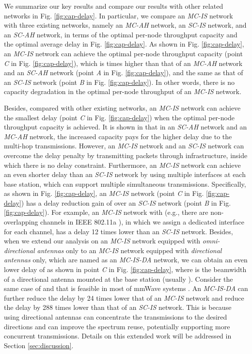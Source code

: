 \documentclass[10pt,journal]{IEEEtran}
\begin{document}
We summarize our key results and compare our results with other related networks in Fig. \ref{fig:cap-delay}. In particular, we compare an \textit{MC-IS} network with three existing networks, namely an \textit{MC-AH} network, an \textit{SC-IS} network, and an \textit{SC-AH} network, in terms of the optimal per-node throughput capacity  and the optimal average delay  in Fig. \ref{fig:cap-delay}. As shown in Fig. \ref{fig:cap-delay}, an \textit{MC-IS} network can achieve the optimal per-node throughput capacity  (point \textit{C} in Fig. \ref{fig:cap-delay}), which is  times higher than that of an \textit{MC-AH} network and an \textit{SC-AH} network (point \textit{A} in Fig. \ref{fig:cap-delay}), and the same as that of an \textit{SC-IS} network (point \textit{B} in Fig. \ref{fig:cap-delay}). In other words, there is no capacity degradation in the optimal per-node throughput of an \textit{MC-IS} network. 

Besides, compared with other existing networks, an \textit{MC-IS} network can achieve the smallest delay  (point \textit{C} in Fig. \ref{fig:cap-delay}) when the optimal per-node throughput capacity  is achieved. It is shown in \cite{gamal:2004,gamal:TIT2006} that in an \textit{SC-AH} network and an \textit{MC-AH} network, the increased capacity pays for the higher delay due to the multi-hop transmissions. However, an \textit{MC-IS} network and an \textit{SC-IS} network can overcome the delay penalty by transmitting packets through infrastructure, inside which there is no delay constraint. Furthermore, an \textit{MC-IS} network can achieve an even shorter delay than an \textit{SC-IS} network by using multiple interfaces at each base station, which can support multiple simultaneous transmissions. Specifically, as shown in Fig. \ref{fig:cap-delay}, an \textit{MC-IS} network (point \textit{C} in Fig. \ref{fig:cap-delay}) has a delay reduction gain of  over an \textit{SC-IS} network (point \textit{B} in Fig. \ref{fig:cap-delay}). For example, an \textit{MC-IS} network with  (e.g., there are  non-overlapping channels in IEEE 802.11a \cite{IEEE80211a:1999}), in which we assign a dedicated interface for each channel, has a delay 12 times lower than an \textit{SC-IS} network. Besides, when we extend our analysis on an \emph{MC-IS} network equipped with \emph{omni-directional antennas} only to an \emph{MC-IS} network equipped with \emph{directional antennas} only, which are named as an \emph{MC-IS-DA} network, we can obtain an even lower delay of  as shown in point \textit{C} in Fig. \ref{fig:cap-delay}, where  is the beamwidth of a directional antenna mounted at the base station (usually ). Consider the same case of  and  that is feasible in most of mmWave systems \cite{Rappaport:icc15}. An \emph{MC-IS-DA} can further reduce the delay by 24 times lower that of an \emph{MC-IS} network and reduce the delay by 288 times lower than that of an \emph{SC-IS} network. This is because using directional antennas can concentrate the transmissions to the desired directions and can improve the spectrum reuse, potentially supporting more concurrent transmissions. Details on this extended work will be addressed in Section \ref{sec:discussion}.
\end{document}
